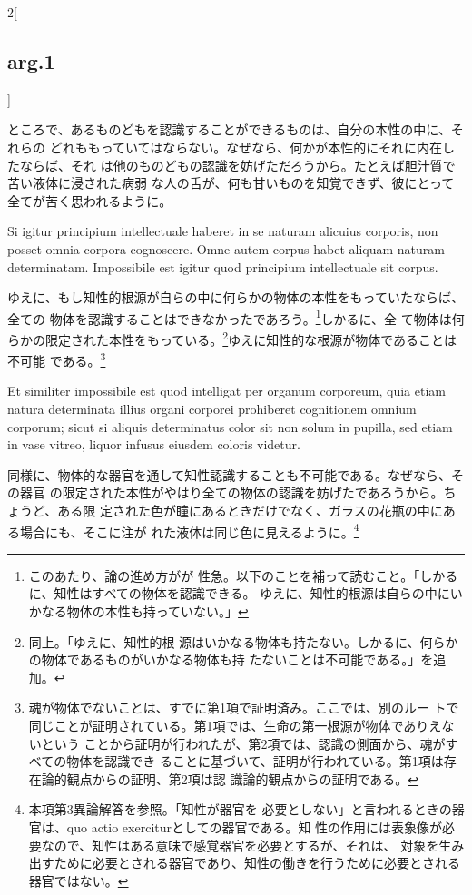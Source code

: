 \documentclass[paper=a4paper,fontsize=10pt,jafontsize=9pt,titlepage]{jlreq}
\begin{document}
\begin{paracol}{2}[\subsection{arg.1}]
\switchcolumn

 ところで、あるものどもを認識することができるものは、自分の本性の中に、それらの
 どれももっていてはならない。なぜなら、何かが本性的にそれに内在したならば、それ
 は他のものどもの認識を妨げただろうから。たとえば胆汁質で苦い液体に浸された病弱
 な人の舌が、何も甘いものを知覚できず、彼にとって全てが苦く思われるように。

\switchcolumn*

 Si igitur principium intellectuale haberet in se naturam alicuius corporis, non
 posset omnia corpora cognoscere. Omne autem corpus habet aliquam naturam
 determinatam. Impossibile est igitur quod principium intellectuale sit corpus.

\switchcolumn

 ゆえに、もし知性的根源が自らの中に何らかの物体の本性をもっていたならば、全ての
 物体を認識することはできなかったであろう。\footnote{このあたり、論の進め方がが
 性急。以下のことを補って読むこと。「しかるに、知性はすべての物体を認識できる。
 ゆえに、知性的根源は自らの中にいかなる物体の本性も持っていない。」}しかるに、全
 て物体は何らかの限定された本性をもっている。\footnote{同上。「ゆえに、知性的根
 源はいかなる物体も持たない。しかるに、何らかの物体であるものがいかなる物体も持
 たないことは不可能である。」を追加。}ゆえに知性的な根源が物体であることは不可能
 である。\footnote{魂が物体でないことは、すでに第1項で証明済み。ここでは、別のルー
 トで同じことが証明されている。第1項では、生命の第一根源が物体でありえないという
 ことから証明が行われたが、第2項では、認識の側面から、魂がすべての物体を認識でき
 ることに基づいて、証明が行われている。第1項は存在論的観点からの証明、第2項は認
 識論的観点からの証明である。}

\switchcolumn*

 Et similiter impossibile est quod intelligat per organum corporeum, quia etiam
 natura determinata illius organi corporei prohiberet cognitionem omnium
 corporum; sicut si aliquis determinatus color sit non solum in pupilla, sed
 etiam in vase vitreo, liquor infusus eiusdem coloris videtur.

\switchcolumn

 同様に、物体的な器官を通して知性認識することも不可能である。なぜなら、その器官
 の限定された本性がやはり全ての物体の認識を妨げたであろうから。ちょうど、ある限
 定された色が瞳にあるときだけでなく、ガラスの花瓶の中にある場合にも、そこに注が
 れた液体は同じ色に見えるように。\footnote{本項第3異論解答を参照。「知性が器官を
 必要としない」と言われるときの器官は、quo actio exerciturとしての器官である。知
 性の作用には表象像が必要なので、知性はある意味で感覚器官を必要とするが、それは、
 対象を生み出すために必要とされる器官であり、知性の働きを行うために必要とされる
 器官ではない。}


\end{paracol}
\end{document}
